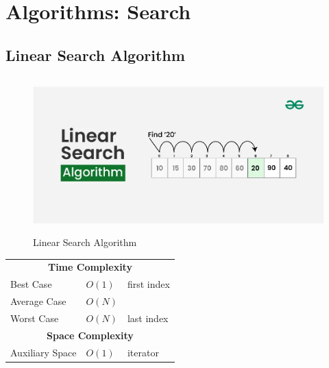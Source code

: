 \chapter{Algorithms: Search}

\section{Linear Search Algorithm \cite{gfg-linear-search}}\label{Linear Search Algorithm}

\begin{table}[h]
    \begin{minipage}[t]{0.5\linewidth}
        \begin{figure}[H]
            \centering
            \includegraphics[width=\linewidth,height=6cm,keepaspectratio]{Pictures/ds-algo/Linear-Search-algorithm.jpg}
            \caption{Linear Search Algorithm}
        \end{figure}
    \end{minipage}
    \hfill
    \begin{minipage}[t]{0.35\linewidth}
        \begin{table}[H]
            \begin{tabular}{l l l}
                \multicolumn{3}{c}{\textbf{Time Complexity}} \\
                 Best Case & $O(1)$ & first index \\
                 Average Case & $O(N)$ &  \\
                 Worst Case & $O(N)$ & last index \\
                 \multicolumn{3}{c}{\textbf{Space Complexity}}\\
                 Auxiliary Space & $O(1)$ & iterator \\
            \end{tabular}
        \end{table}
    \end{minipage}
\end{table}

